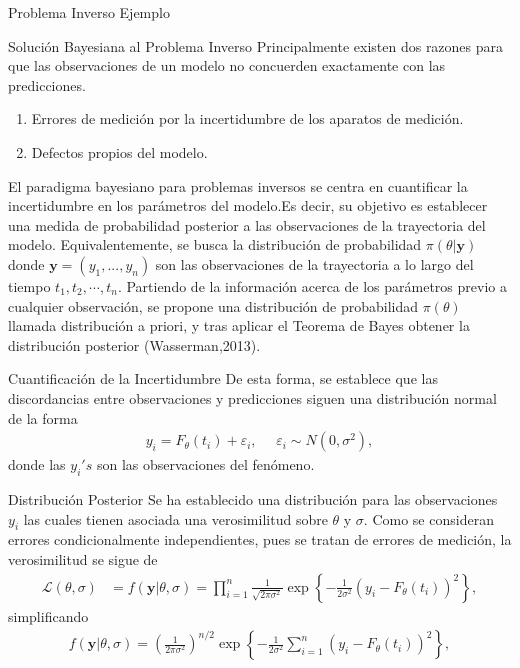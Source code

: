 \documentclass[10pt,aspectratio=169]{beamer}
\begin{document}
\begin{frame}{Problema Inverso}
  Ejemplo
  
\end{frame}

\begin{frame}{Solución Bayesiana al Problema Inverso}
  Principalmente existen dos razones para que las observaciones de un modelo no concuerden exactamente con las predicciones.

  \begin{enumerate}
    \item Errores de medición por la incertidumbre de los aparatos de medición.
    \item Defectos propios del modelo.
  \end{enumerate}
\end{frame}

\begin{frame}
  El paradigma bayesiano para problemas inversos se centra en cuantificar la incertidumbre en los parámetros del modelo.Es decir, su objetivo es establecer una medida de probabilidad posterior a las observaciones de la trayectoria del modelo. Equivalentemente, se busca la distribución de probabilidad $\pi(\theta|\mathbf{y})$ donde $\mathbf{y} = (y_1,...,y_n)$ son las observaciones de la trayectoria a lo largo del tiempo $t_1, t_2, \cdots, t_n$. Partiendo de la información acerca de los parámetros previo a cualquier observación, se propone una distribución de probabilidad $\pi(\theta)$ llamada distribución a priori, y tras aplicar el Teorema de Bayes obtener la distribución posterior (Wasserman,2013).
\end{frame}

\begin{frame}{Cuantificación de la Incertidumbre}
  De esta forma, se establece que las discordancias entre observaciones y predicciones siguen una distribución normal de la forma
  \begin{align*}
      y_i = F_{\theta} (t_i) + \varepsilon_i, \:\:\:\:\:\: \varepsilon_i \sim N(0,\sigma^2),
  \end{align*}
  donde las $y_i's$ son las observaciones del fenómeno.
\end{frame}

\begin{frame}{Distribución Posterior}
  Se ha establecido una distribución para las observaciones $y_i$ las cuales tienen asociada una verosimilitud sobre $\theta$ y $\sigma$. Como se consideran errores condicionalmente independientes, pues se tratan de errores de medición, la verosimilitud se sigue de
  \begin{align*}
      \mathcal{L}(\theta,\sigma) &= f(\mathbf{y}|\theta,\sigma) = \prod_{i = 1}^{n} \frac{1}{\sqrt{2\pi \sigma^2}} \exp \left \{ -\frac{1}{2\sigma^2}\left(y_i - F_{\theta}(t_i)\right)^2 \right \} , 
  \end{align*}
  simplificando
  \begin{align}
      f(\mathbf{y}|\theta,\sigma) = \left(\frac{1}{2\pi \sigma^2}\right) ^{n/2}\exp \left \{  -\frac{1}{2\sigma^2}\sum_{i = 1}^{n} \left(y_i - F_{\theta}(t_i)\right)^2 \right \},
      \label{2.2.03}
  \end{align}
\end{frame}
\end{document}
